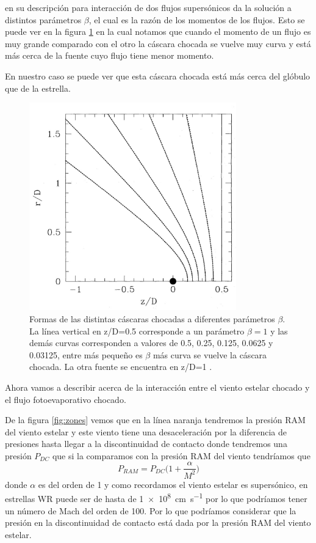 \documentclass{book}
\begin{document}
\cite{Canto:1996} en su descripción para interacción de dos flujos supersónicos da la solución a distintos parámetros $\beta$, el cual es la razón de los momentos de los flujos. Esto se puede ver en la figura \ref{fig:Canto2} en la cual notamos que cuando el momento de un flujo es muy  grande comparado con el otro la cáscara chocada se vuelve muy curva y está más cerca de la fuente cuyo flujo tiene menor momento.

En nuestro caso se puede ver que esta cáscara chocada está más cerca del glóbulo que de la estrella.

\begin{figure}[h]
    \centering    \includegraphics[width=0.8\textwidth]{images Chapter 2/C2_Canto2.jpg}
    \caption{Formas de las distintas cáscaras chocadas a diferentes parámetros $\beta$. La línea vertical en z/D=0.5 corresponde a un parámetro $\beta=1$ y las demás curvas corresponden a valores de 0.5, 0.25, 0.125, 0.0625 y 0.03125, entre más pequeño es $\beta$ más curva se vuelve la cáscara chocada. La otra fuente se encuentra en z/D=1 \citep{Canto:1996}.}
    \label{fig:Canto2}
\end{figure}

Ahora vamos a describir acerca de la interacción entre el viento estelar chocado y el flujo fotoevaporativo chocado. 

De la figura \ref{fig:zones} vemos que en la línea naranja tendremos la presión RAM del viento estelar y este viento tiene una desaceleración por la diferencia de presiones hasta llegar a la discontinuidad de contacto donde tendremos una presión $P_{DC}$ que si la comparamos con la presión RAM del viento tendríamos que
\[P_{RAM}=P_{DC}\Big(1+\frac{\alpha}{M^2}\Big)\] donde $\alpha$ es del orden de 1 y como recordamos el viento estelar es supersónico, en estrellas WR puede ser de hasta de \SI{1e8}{cm.s^{-1}} por lo que podríamos tener un número de Mach del orden de 100. Por lo que podríamos considerar que la presión en la discontinuidad de contacto está dada por la presión RAM del viento estelar.
\end{document}
